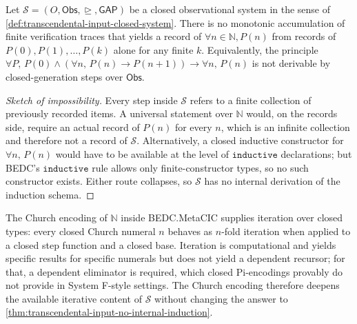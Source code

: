 \begin{theorem}
\label{thm:transcendental-input-no-internal-induction}
Let $\mathcal{S} = (O, \mathsf{Obs}, \trianglerighteq, \mathsf{GAP})$ be a closed observational system in the sense of \autoref{def:transcendental-input-closed-system}. There is no monotonic accumulation of finite verification traces that yields a record of $\forall n \in \mathbb{N}, P(n)$ from records of $P(0), P(1), \ldots, P(k)$ alone for any finite $k$. Equivalently, the principle $\forall P,\, P(0) \wedge (\forall n,\, P(n) \to P(n+1)) \to \forall n,\, P(n)$ is not derivable by closed-generation steps over $\mathsf{Obs}$.
\end{theorem}

\begin{proof}[Sketch of impossibility]
Every step inside $\mathcal{S}$ refers to a finite collection of previously recorded items. A universal statement over $\mathbb{N}$ would, on the records side, require an actual record of $P(n)$ for every $n$, which is an infinite collection and therefore not a record of $\mathcal{S}$. Alternatively, a closed inductive constructor for $\forall n,\, P(n)$ would have to be available at the level of $\texttt{inductive}$ declarations; but BEDC's $\texttt{inductive}$ rule allows only finite-constructor types, so no such constructor exists. Either route collapses, so $\mathcal{S}$ has no internal derivation of the induction schema.
\end{proof}

\begin{remark}
\label{rem:transcendental-input-church-no-bridge}
The Church encoding of $\mathbb{N}$ inside BEDC.MetaCIC supplies iteration over closed types: every closed Church numeral $n$ behaves as $n$-fold iteration when applied to a closed step function and a closed base. Iteration is computational and yields specific results for specific numerals but does not yield a dependent recursor; for that, a dependent eliminator is required, which closed Pi-encodings provably do not provide in System F-style settings. The Church encoding therefore deepens the available iterative content of $\mathcal{S}$ without changing the answer to \autoref{thm:transcendental-input-no-internal-induction}.
\end{remark}

